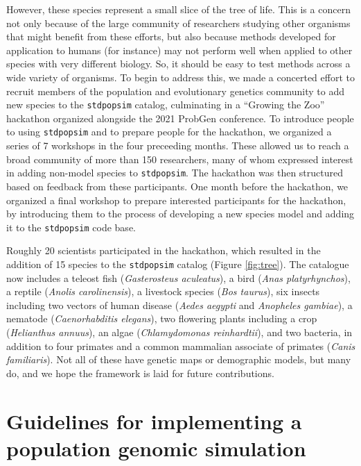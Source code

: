 \documentclass[hidelinks]{article}
\makeatletter
\newcommand{\stdpopsim}{\texttt{stdpopsim}\xspace}
\newcommand{\labelname}[1]{\def\@currentlabelname{#1}}
\makeatother
\begin{document}
However,
these species represent a small slice of the tree of life.
This is a concern
not only because of the large community of researchers studying other organisms that might benefit from these efforts,
but also because methods developed for application to humans (for instance)
may not perform well when applied to other species with very different biology.
So, it should be easy to test methods across a wide variety of organisms.
To begin to address this, we made a concerted effort
to recruit members of the population and evolutionary genetics community
to add new species to the \stdpopsim catalog, culminating in a
``Growing the Zoo'' hackathon organized alongside the 2021 ProbGen conference.
To introduce people to using \stdpopsim and to prepare people for the hackathon,
we organized a series of 7 workshops in the four preceeding months.
These allowed us to reach a broad community of more than 150 researchers,
many of whom expressed interest in adding non-model species to \stdpopsim.
The hackathon was then structured based on feedback from these participants.
One month before the hackathon, we organized a final workshop to prepare interested
participants for the hackathon, by introducing them to  the process of developing
a new species model and adding it to the \stdpopsim code base.

Roughly 20 scientists participated in the hackathon,
which resulted in the addition of 15 species to the \stdpopsim catalog
(Figure \ref{fig:tree}).
The catalogue now includes
a teleost fish (\textit{Gasterosteus aculeatus}),
a bird (\textit{Anas platyrhynchos}),
a reptile (\textit{Anolis carolinensis}),
a livestock species (\textit{Bos taurus}),
six insects including two vectors of human disease (\textit{Aedes aegypti} and \textit{Anopheles gambiae}),
a nematode (\textit{Caenorhabditis elegans}),
two flowering plants including a crop (\textit{Helianthus annuus}),
an algae (\textit{Chlamydomonas reinhardtii}),
and two bacteria,
in addition to four primates and a common mammalian associate of primates (\textit{Canis familiaris}).
Not all of these have genetic maps or demographic models,
but many do, and we hope the framework is laid for future contributions.


\section*{Guidelines for implementing a population genomic simulation}
    \labelname{Guidelines}
    \label{sec:sim-guidelines}
\end{document}
